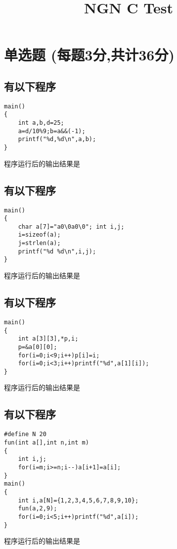 ﻿\documentclass  [11pt,twocolumn]{article}
\title{NGN C Test}
\author{}
\date{}
\begin{document}
\begin{minipage}{0.9\linewidth}
\end{minipage}


\section{单选题 (每题3分,共计36分)}
\subsection{有以下程序}
\begin{lstlisting}
main() 
{ 
    int a,b,d=25; 
    a=d/10%9;b=a&&(-1); 
    printf("%d,%d\n",a,b); 
} 
\end{lstlisting}
程序运行后的输出结果是\myblank{3em}


\subsection{有以下程序}
\begin{lstlisting}
main() 
{ 
    char a[7]="a0\0a0\0"; int i,j; 
    i=sizeof(a);
    j=strlen(a); 
    printf("%d %d\n",i,j); 
} 
\end{lstlisting}
程序运行后的输出结果是\myblank{3em}


\subsection{有以下程序}
\begin{lstlisting}
main() 
{ 
    int a[3][3],*p,i; 
    p=&a[0][0]; 
    for(i=0;i<9;i++)p[i]=i; 
    for(i=0;i<3;i++)printf("%d",a[1][i]); 
}
\end{lstlisting}
程序运行后的输出结果是\myblank{3em}


\subsection{有以下程序}
\begin{lstlisting}
#define N 20 
fun(int a[],int n,int m) 
{
    int i,j; 
    for(i=m;i>=n;i--)a[i+1]=a[i]; 
} 
main() 
{ 
    int i,a[N]={1,2,3,4,5,6,7,8,9,10}; 
    fun(a,2,9); 
    for(i=0;i<5;i++)printf("%d",a[i]); 
} 
\end{lstlisting}
程序运行后的输出结果是\myblank{3em}
\end{document}
